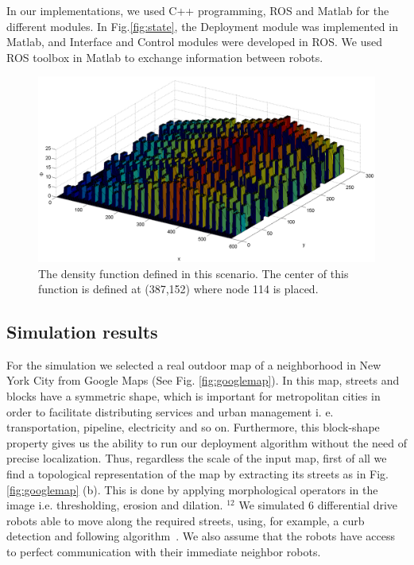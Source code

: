 \documentclass[smallcondensed]{svjour3}
\begin{document}
In our implementations, we used C++ programming, ROS and Matlab for the different modules. In Fig.\ref{fig:state}, the Deployment module was implemented in Matlab, and Interface and Control modules were developed in ROS. We used ROS toolbox in Matlab to exchange information between robots.

%
\begin{figure}[t]
	\centering	
   	\includegraphics[width=0.85\columnwidth]{Figures/Fig12.png}
	\caption[The density function.]{The density function defined in this scenario. The center of this function is defined at (387,152) where node 114  is placed.}
	\label{fig:googlemapdens}
\end{figure}
%

\subsection{Simulation results}
%
For the simulation we selected a real outdoor map of a neighborhood in New York City from Google Maps (See Fig. \ref{fig:googlemap}). In this map, streets and blocks have a symmetric shape, which is important for metropolitan cities in order to facilitate distributing services and urban management i. e. transportation, pipeline, electricity and so on. Furthermore, this block-shape property gives us the ability to run our deployment algorithm without the need of precise localization. Thus, regardless the scale of the input map, first of all we find a topological representation of the map by extracting its streets as in Fig. \ref{fig:googlemap} (b). This is done by applying morphological operators in the image i.e. thresholding, erosion and dilation. {\color{blue}$^{12}$ We simulated 6 differential drive robots able to move along the required streets, using, for example, a curb detection and following algorithm~\cite{Hata14}. We also assume that the robots have access to perfect communication with their immediate neighbor robots.}
\end{document}
